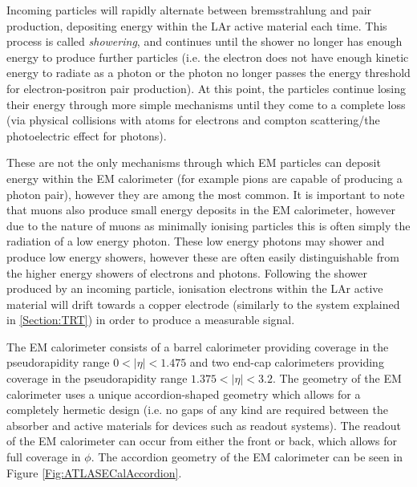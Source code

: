 \documentclass[12pt,a4paper,epsf,portrait,times,epsfig]{report}
\begin{document}
		Incoming particles will rapidly alternate between bremsstrahlung and pair production, depositing energy within the LAr active material each time. This process is called \textit{showering}, and continues until the shower no longer has enough energy to produce further particles (i.e. the electron does not have enough kinetic energy to radiate as a photon or the photon no longer passes the energy threshold for electron-positron pair production). At this point, the particles continue losing their energy through more simple mechanisms until they come to a complete loss (via physical collisions with atoms for electrons and compton scattering/the photoelectric effect for photons). \par

		These are not the only mechanisms through which EM particles can deposit energy within the EM calorimeter (for example pions are capable of producing a photon pair), however they are among the most common. It is important to note that muons also produce small energy deposits in the EM calorimeter, however due to the nature of muons as minimally ionising particles this is often simply the radiation of a low energy photon. These low energy photons may shower and produce low energy showers, however these are often easily distinguishable from the higher energy showers of electrons and photons. Following the shower produced by an incoming particle, ionisation electrons within the LAr active material will drift towards a copper electrode (similarly to the system explained in \ref{Section:TRT}) in order to produce a measurable signal. \par
		
		The EM calorimeter consists of a barrel calorimeter providing coverage in the pseudorapidity range $0 < |\eta| < 1.475$ and two end-cap calorimeters providing coverage in the pseudorapidity range $1.375 < |\eta| < 3.2$. The geometry of the EM calorimeter uses a unique accordion-shaped geometry which allows for a completely hermetic design (i.e. no gaps of any kind are required between the absorber and active materials for devices such as readout systems). The readout of the EM calorimeter can occur from either the front or back, which allows for full coverage in $\phi$. The accordion geometry of the EM calorimeter can be seen in Figure \ref{Fig:ATLASECalAccordion}. 
\end{document}
